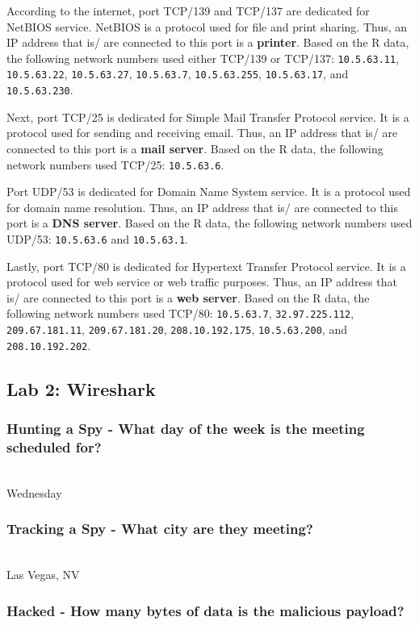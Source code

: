 \documentclass[letterpaper,10pt,titlepage,draftclsnofoot,onecolumn]{IEEEtran}
\begin{document}
According to the internet, port TCP/139 and TCP/137 are dedicated for NetBIOS service. NetBIOS is a protocol used for file and print sharing. Thus, an IP address that is/ are connected to this port is a \textbf{printer}. Based on the R data, the following network numbers used either TCP/139 or TCP/137: \verb|10.5.63.11|, \verb|10.5.63.22|, \verb|10.5.63.27|, \verb|10.5.63.7|, \verb|10.5.63.255|, \verb|10.5.63.17|, and \verb|10.5.63.230|.

Next, port TCP/25 is dedicated for Simple Mail Transfer Protocol service. It is a protocol used for sending and receiving email. Thus, an IP address that is/ are connected to this port is a \textbf{mail server}. Based on the R data, the following network numbers used TCP/25: \verb|10.5.63.6|.

Port UDP/53 is dedicated for Domain Name System service. It is a protocol used for domain name resolution. Thus, an IP address that is/ are connected to this port is a \textbf{DNS server}. Based on the R data, the following network numbers used UDP/53: \verb|10.5.63.6| and \verb|10.5.63.1|.

Lastly, port TCP/80 is dedicated for Hypertext Transfer Protocol service. It is a protocol used for web service or web traffic purposes. Thus, an IP address that is/ are connected to this port is a \textbf{web server}. Based on the R data, the following network numbers used TCP/80: \verb|10.5.63.7|, \verb|32.97.225.112|, \verb|209.67.181.11|, \verb|209.67.181.20|, \verb|208.10.192.175|, \verb|10.5.63.200|, and \verb|208.10.192.202|.

\subsection{Lab 2: Wireshark}
\subsubsection{Hunting a Spy - What day of the week is the meeting scheduled for? }
\hfill\\

Wednesday
\hfill\\
\subsubsection{Tracking a Spy - What city are they meeting?}
\hfill\\

Las Vegas, NV
\hfill\\
\subsubsection{Hacked - How many bytes of data is the malicious payload? }
\hfill\\
\end{document}
